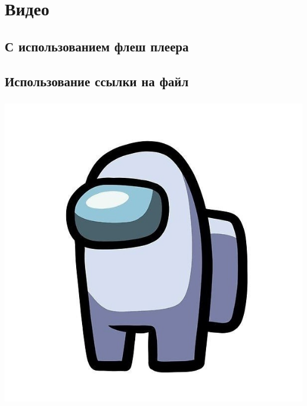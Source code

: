 \documentclass[russian]{beamer}
\begin{document}
\section{Видео}
\subsection{С использованием флеш плеера}
\begin{frame}
	\frametitle{\insertsubsection}
\end{frame}

\subsection{Использование ссылки на файл}
\begin{frame}
	\begin{center}
		\frametitle{\insertsubsection}
		\href{run:AMOGUS.avi}{\includegraphics[scale=0.25]{AMOGUS.jpg}}
	\end{center}
\end{frame}
\end{document}
